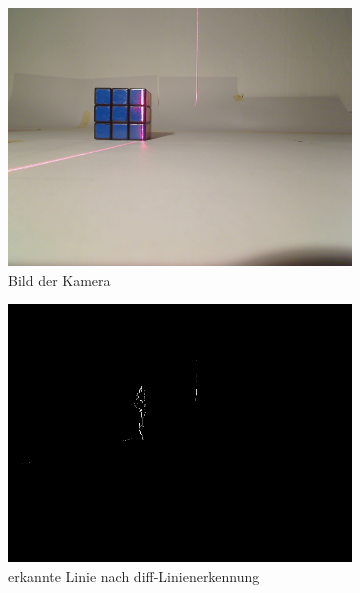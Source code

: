 \documentclass[ngerman,a4paper,parskip=half]{scrartcl}
\begin{document}
\begin{figure}[H]
	\centering
	\begin{subfigure}{0.32\textwidth}
		\includegraphics[width=\textwidth]{includes/blue_d.png}
		\caption{Bild der Kamera\\}
		\label{fig:blue_d_cam}
	\end{subfigure}
	\hfill
	\begin{subfigure}{0.32\textwidth}
		\includegraphics[width=\textwidth]{includes/blue_d_diff.png}
		\caption{erkannte Linie nach diff-Linienerkennung}
		\label{fig:blue_d_diff}
	\end{subfigure}
	\hfill
	\begin{subfigure}{0.32\textwidth}

\end{subfigure}
\end{figure}
\end{document}
